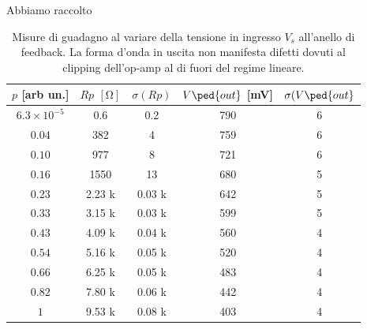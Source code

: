 \documentclass[10pt, a4paper, italian]{article}
\begin{document}
Abbiamo raccolto 
\begin{table}[htbp]
\centering
\begin{tabular}{ccccc}
\toprule
$p$ [arb un.] & $Rp$ $[\si{\ohm}]$ & $\sigma(Rp)$ & $V\ped{out}$ [mV] &
$\sigma(V\ped{out}$ \\
\midrule
\midrule
$6.3 \times 10^{-5}$  	& 0.6     & 0.2 	& 790        & 6		\\
$0.04$   				& 382     & 4 		& 759        & 6 		\\
$0.10$   				& 977     & 8 		& 721        & 6   		\\
$0.16$   				& 1550    & 13 		& 680        & 5 		\\
$0.23$   				& 2.23 k  & 0.03 k 	& 642        & 5 		\\
$0.33$   				& 3.15 k  & 0.03 k	& 599        & 5		\\
$0.43$   				& 4.09 k  & 0.04 k	& 560        & 4  		\\
$0.54$   				& 5.16 k  & 0.05 k	& 520        & 4 		\\
$0.66$   				& 6.25 k  & 0.05 k	& 483        & 4 		\\
$0.82$   				& 7.80 k  & 0.06 k	& 442        & 4 		\\
$1$             		& 9.53 k  & 0.08 k	& 403        & 4 		\\         
\bottomrule
\end{tabular}
\caption{Misure di guadagno al variare della tensione in ingresso $V_s$
all'anello di feedback. La forma d'onda in uscita non manifesta difetti
dovuti al clipping dell'op-amp al di fuori del regime lineare.
\label{tab: VoutRp}}
\end{table}
\end{document}
